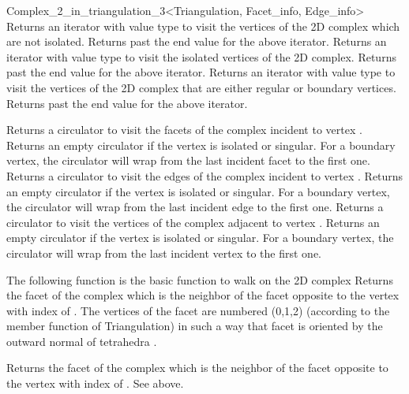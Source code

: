 \begin{ccRefClass}{Complex_2_in_triangulation_3<Triangulation, Facet_info, Edge_info>}
{Returns an iterator with value type  to visit the
vertices of the 2D complex which are not isolated.}
\ccGlue
{}
{Returns past the end value for the above iterator.}
\ccGlue
{}
{Returns an iterator with value type  to visit the isolated
vertices of the 2D complex.}
\ccGlue
{}
{Returns past the end value for the above iterator.}
\ccGlue
{}
{Returns an iterator with value type  to visit the 
vertices of the 2D complex that are either regular or boundary vertices.}
\ccGlue
{}
{Returns past the end value for the above iterator.}


{Returns a circulator to visit the facets of the complex incident to
vertex . Returns an empty circulator if the vertex is isolated or
singular. For a boundary  vertex,  the circulator will wrap from the last
incident facet  to the first one.}
\ccGlue
{}
{Returns a circulator to visit the edges of the complex incident to
vertex . Returns an empty circulator if the vertex is isolated or
singular. For a boundary  vertex,  the circulator will wrap from the last
incident edge  to the first one.}
\ccGlue
{}
{Returns a circulator to visit the vertices of the complex adjacent to
vertex . Returns an empty circulator if the vertex is isolated or
singular. For a boundary  vertex,  the circulator will wrap from the last
incident vertex  to the first one.}

The following function is the basic function to walk on the 2D
complex
{Returns the facet of the complex which is the neighbor of 
the facet  opposite to the vertex with index  of
.
The vertices of the facet  are numbered
(0,1,2) (according to the  member function
of Triangulation)
in such a way that facet  is oriented by the
outward normal of tetrahedra .}


{Returns the facet of the complex which is the neighbor of 
the facet  opposite to the vertex with index  of .
See above.}


\end{ccRefClass}
